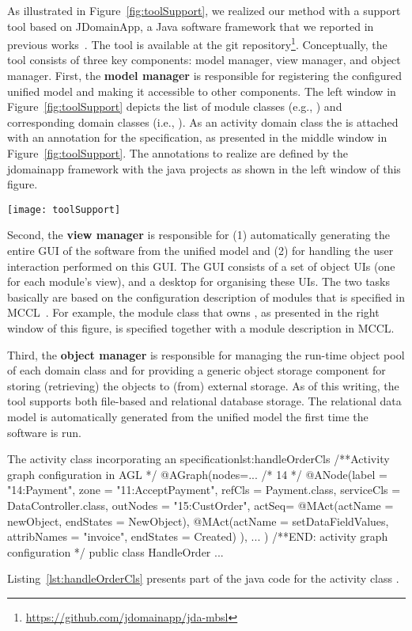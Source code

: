 As illustrated in Figure~\ref{fig:toolSupport}, we realized our method with a support tool based on JDomainApp, a Java software framework that we reported in previous works~\cite{le_domain_2018}. The tool is available at the git repository\footnote{\url{https://github.com/jdomainapp/jda-mbsl}}. %
%
Conceptually, the tool consists of three key components: model manager, view manager, and object manager. First, the \textbf{model manager} is responsible for registering the configured unified model and making it accessible to other components. The left window in Figure~\ref{fig:toolSupport} depicts the list of module classes (e.g., ) and corresponding domain classes (i.e., ). As an activity domain class the  is attached with an annotation  for the \agl specification, as presented in the middle window in Figure~\ref{fig:toolSupport}. The annotations to realize \agl are defined by the jdomainapp framework with the java projects as shown in the left window of this figure. 

\begin{figure*}[ht]
	\centering
	\texttt{[image: toolSupport]}
	\caption{Illustration for the JDomainApp-based realization and usability of \agl.} %
	\label{fig:toolSupport}
\end{figure*}

Second, the \textbf{view manager} is responsible for (1) automatically generating the entire GUI of the software from the unified model and (2) for handling the user interaction performed on this GUI. The GUI consists of a set of object UIs (one for each module's view), and a desktop for organising these UIs. The two tasks basically are based on the configuration description of modules that is specified in MCCL~\cite{le_domain_2018}. For example, the module class  that owns , as presented in the right window of this figure, is specified together with a module description in MCCL.

Third, the \textbf{object manager} is responsible for managing the run-time object pool of each domain class and for providing a generic object storage component for storing (retrieving) the objects to (from) external storage. As of this writing, the tool supports both file-based and relational database storage. The relational data model is automatically generated from the unified model the first time the software is run.

\begin{lstcodeplainssm}{The activity class  incorporating an \agl specification}{lst:handleOrderCls}
/**Activity graph configuration in AGL */
@AGraph(nodes={...	
	/* 14 */    
	@ANode(label = "14:Payment", zone = "11:AcceptPayment",
		refCls = Payment.class, serviceCls = DataController.class, 
		outNodes = {"15:CustOrder"},
		actSeq={
			@MAct(actName = newObject, endStates = {NewObject}),
			@MAct(actName = setDataFieldValues, attribNames = {"invoice"}, endStates = {Created})
		}), ...
})
/**END: activity graph configuration */
public class HandleOrder {...}
\end{lstcodeplainssm}

Listing~\ref{lst:handleOrderCls} presents part of the java code for the activity class . 